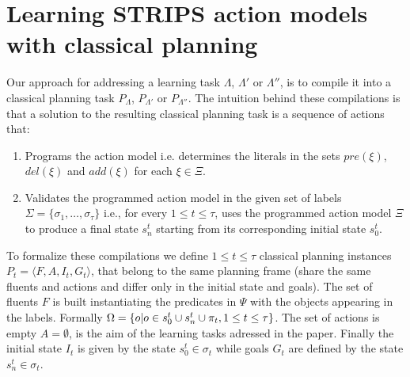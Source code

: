 \documentclass[letterpaper]{article} %
\newcommand{\tup}[1]{{\langle #1 \rangle}}
\begin{document}
\section{Learning STRIPS action models with classical planning}
Our approach for addressing a learning task $\Lambda$, $\Lambda'$ or $\Lambda''$, is to compile it into a classical planning task $P_{\Lambda}$, $P_{\Lambda'}$ or $P_{\Lambda''}$. The intuition behind these compilations is that a solution to the resulting classical planning task is a sequence of actions that:
\begin{enumerate}
\item Programs the action model i.e. determines the literals in the sets $pre(\xi)$, $del(\xi)$ and $add(\xi)$ for each $\xi\in\Xi$.
\item Validates the programmed action model in the given set of labels $\Sigma=\{\sigma_1,\ldots,\sigma_{\tau}\}$ i.e., for every {\small $1\leq t\leq \tau$}, uses the programmed action model $\Xi$ to produce a final state $s_{n}^t$ starting from its corresponding initial state $s_0^t$.
\end{enumerate}

To formalize these compilations we define {\small $1\leq t\leq \tau$} classical planning instances $P_t=\tup{F,A,I_t,G_t}$, that belong to the same planning frame (share the same fluents and actions and differ only in the initial state and goals). The set of fluents $F$ is built instantiating the predicates in $\Psi$ with the objects appearing in the labels. Formally $\Omega=\{o|o\in s_0^t\cup s_n^t\cup\pi_t, {\small 1\leq t\leq \tau}\}$. The set of actions is empty $A=\emptyset$, is the aim of the learning tasks adressed in the paper. Finally the initial state $I_t$ is given by the state $s_0^t\in \sigma_t$ while goals $G_t$ are defined by the state $s_n^t\in \sigma_t$. 
\end{document}
